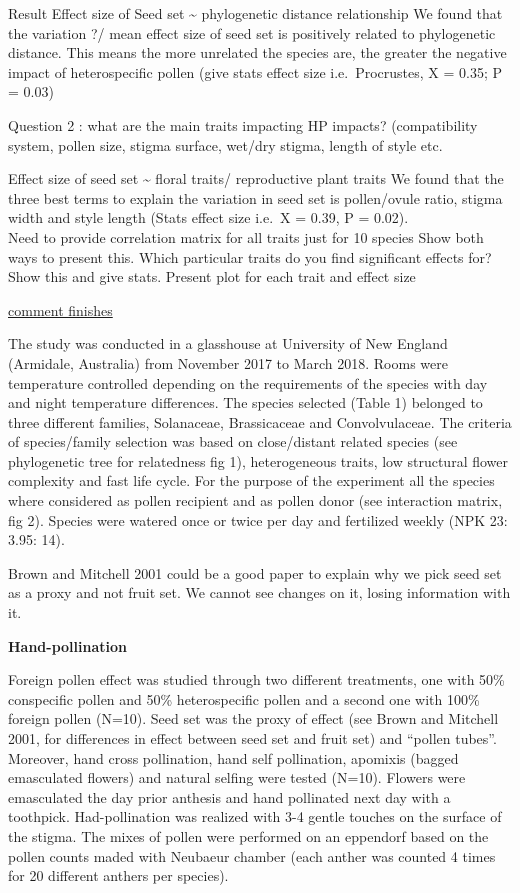 \documentclass[11pt,a4paper]{article}
\begin{document}
Result Effect size of Seed set \textasciitilde{} phylogenetic distance
relationship We found that the variation ?/ mean effect size of seed set
is positively related to phylogenetic distance. This means the more
unrelated the species are, the greater the negative impact of
heterospecific pollen (give stats effect size i.e.~Procrustes, X = 0.35;
P = 0.03)

Question 2 : what are the main traits impacting HP impacts?
(compatibility system, pollen size, stigma surface, wet/dry stigma,
length of style etc.

Effect size of seed set \textasciitilde{} floral traits/ reproductive
plant traits We found that the three best terms to explain the variation
in seed set is pollen/ovule ratio, stigma width and style length (Stats
effect size i.e.~X = 0.39, P = 0.02).\\
Need to provide correlation matrix for all traits just for 10 species
Show both ways to present this. Which particular traits do you find
significant effects for? Show this and give stats. Present plot for each
trait and effect size

\href{}{comment finishes}

The study was conducted in a glasshouse at University of New England
(Armidale, Australia) from November 2017 to March 2018. Rooms were
temperature controlled depending on the requirements of the species with
day and night temperature differences. The species selected (Table 1)
belonged to three different families, Solanaceae, Brassicaceae and
Convolvulaceae. The criteria of species/family selection was based on
close/distant related species (see phylogenetic tree for relatedness fig
1), heterogeneous traits, low structural flower complexity and fast life
cycle. For the purpose of the experiment all the species where
considered as pollen recipient and as pollen donor (see interaction
matrix, fig 2). Species were watered once or twice per day and
fertilized weekly (NPK 23: 3.95: 14).

Brown and Mitchell 2001 could be a good paper to explain why we pick
seed set as a proxy and not fruit set. We cannot see changes on it,
losing information with it.

\textbf{Hand-pollination}

Foreign pollen effect was studied through two different treatments, one
with 50\% conspecific pollen and 50\% heterospecific pollen and a second
one with 100\% foreign pollen (N=10). Seed set was the proxy of effect
(see Brown and Mitchell 2001, for differences in effect between seed set
and fruit set) and ``pollen tubes''. Moreover, hand cross pollination,
hand self pollination, apomixis (bagged emasculated flowers) and natural
selfing were tested (N=10). Flowers were emasculated the day prior
anthesis and hand pollinated next day with a toothpick. Had-pollination
was realized with 3-4 gentle touches on the surface of the stigma. The
mixes of pollen were performed on an eppendorf based on the pollen
counts maded with Neubaeur chamber (each anther was counted 4 times for
20 different anthers per species).
\end{document}
